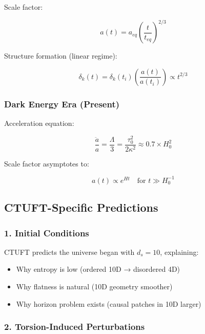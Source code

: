 Scale factor:

\begin{equation}
    a(t) = a_{eq} \left(\frac{t}{t_{eq}}\right)^{2/3}
\end{equation}

Structure formation (linear regime):

\begin{equation}
    \delta_k(t) = \delta_k(t_i) \left(\frac{a(t)}{a(t_i)}\right) \propto t^{2/3}
\end{equation}

\subsubsection{Dark Energy Era (Present)}

Acceleration equation:

\begin{equation}
    \frac{\ddot{a}}{a} = \frac{\Lambda}{3} = \frac{\tau_0^2}{2\kappa^2} \approx 0.7 \times H_0^2
\end{equation}

Scale factor asymptotes to:

\begin{equation}
    a(t) \propto e^{Ht} \quad \text{for } t \gg H_0^{-1}
\end{equation}

\subsection{CTUFT-Specific Predictions}

\subsubsection{1. Initial Conditions}

CTUFT predicts the universe began with $d_s = 10$, explaining:
\begin{itemize}
    \item Why entropy is low (ordered 10D → disordered 4D)
    \item Why flatness is natural (10D geometry smoother)
    \item Why horizon problem exists (causal patches in 10D larger)
\end{itemize}

\subsubsection{2. Torsion-Induced Perturbations}

